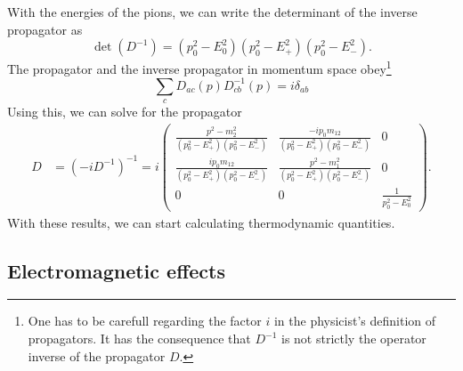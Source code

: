 With the energies of the pions, we can write the determinant of the inverse propagator as
%
\begin{equation}
    \det(D^{-1}) = (p_0^2 - E_0^2) (p_0^2 - E_+^2) (p_0^2 - E_-^2).
\end{equation}
%
The propagator and the inverse propagator in momentum space obey\footnote{One has to be carefull regarding the factor $i$ in the physicist's definition of propagators. It has the consequence that $D^{-1}$ is not strictly the operator inverse of the propagator $D$.}
%
\begin{equation}
    \sum_c D_{ac}(p)D_{cb}^{-1}(p) = i \delta_{ab}
\end{equation}
%
Using this, we can solve for the propagator
%
\begin{align}
    D & = (- iD^{-1})^{-1} 
    \label{free pion propagator}
    = i
    \begin{pmatrix}
        \frac{
            p^2 - m_2^2
        }
        {
            (p_0^2 - E_+^2)(p_0^2 - E_-^2)
        } 
        & \frac{
            - ip_0m_{12}
        }
        {
            (p_0^2 - E_+^2)(p_0^2 - E_-^2)
        } & 0 \\
        \frac{
            ip_0m_{12}
        }
        {
            (p_0^2 - E_+^2)(p_0^2 - E_-^2)
        }
        & \frac{
            p^2 - m_1^2
        }
        {
            (p_0^2 - E_+^2)(p_0^2 - E_-^2)
        } & 0 \\
        0 & 0 & 
        \frac{1}{p_0^2 - E_0^2}
    \end{pmatrix}.
\end{align}
%
With these results, we can start calculating thermodynamic quantities.




\subsection{Electromagnetic effects}

